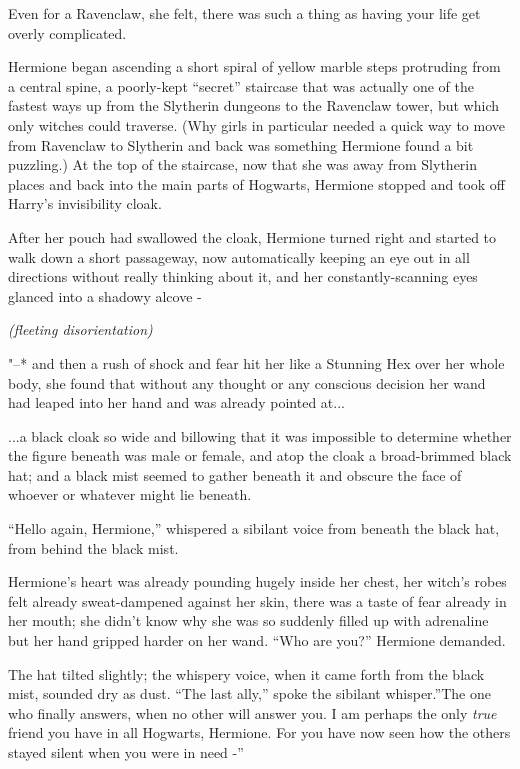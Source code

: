 Even for a Ravenclaw, she felt, there was such a thing as having your
life get overly complicated.

Hermione began ascending a short spiral of yellow marble steps
protruding from a central spine, a poorly-kept ``secret'' staircase that
was actually one of the fastest ways up from the Slytherin dungeons to
the Ravenclaw tower, but which only witches could traverse. (Why girls
in particular needed a quick way to move from Ravenclaw to Slytherin and
back was something Hermione found a bit puzzling.) At the top of the
staircase, now that she was away from Slytherin places and back into the
main parts of Hogwarts, Hermione stopped and took off Harry's
invisibility cloak.

After her pouch had swallowed the cloak, Hermione turned right and
started to walk down a short passageway, now automatically keeping an
eye out in all directions without really thinking about it, and her
constantly-scanning eyes glanced into a shadowy alcove -

\emph{(fleeting disorientation)}

"--* and then a rush of shock and fear hit her like a Stunning Hex over her
whole body, she found that without any thought or any conscious decision
her wand had leaped into her hand and was already pointed at...

...a black cloak so wide and billowing that it was impossible to
determine whether the figure beneath was male or female, and atop the
cloak a broad-brimmed black hat; and a black mist seemed to gather
beneath it and obscure the face of whoever or whatever might lie
beneath.

``Hello again, Hermione,'' whispered a sibilant voice from beneath the
black hat, from behind the black mist.

Hermione's heart was already pounding hugely inside her chest, her
witch's robes felt already sweat-dampened against her skin, there was a
taste of fear already in her mouth; she didn't know why she was so
suddenly filled up with adrenaline but her hand gripped harder on her
wand. ``Who are you?'' Hermione demanded.

The hat tilted slightly; the whispery voice, when it came forth from the
black mist, sounded dry as dust. ``The last ally,'' spoke the sibilant
whisper.''The one who finally answers, when no other will answer you. I
am perhaps the only \emph{true} friend you have in all Hogwarts,
Hermione. For you have now seen how the others stayed silent when you
were in need -''

